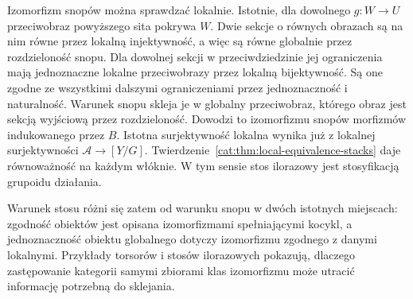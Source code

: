 \begin{przyklad}
Izomorfizm snopów można sprawdzać lokalnie. Istotnie, dla dowolnego $g:W\to U$ przeciwobraz powyższego sita pokrywa $W$. Dwie sekcje o równych obrazach są na nim równe przez lokalną injektywność, a więc są równe globalnie przez rozdzieloność snopu. Dla dowolnej sekcji w przeciwdziedzinie jej ograniczenia mają jednoznaczne lokalne przeciwobrazy przez lokalną bijektywność. Są one zgodne ze wszystkimi dalszymi ograniczeniami przez jednoznaczność i naturalność. Warunek snopu skleja je w globalny przeciwobraz, którego obraz jest sekcją wyjściową przez rozdzieloność. Dowodzi to izomorfizmu snopów morfizmów indukowanego przez $B$. Istotna surjektywność lokalna wynika już z lokalnej surjektywności $\mathcal A\to[Y/G]$. Twierdzenie~\ref{cat:thm:local-equivalence-stacks} daje równoważność na każdym włóknie. W tym sensie stos ilorazowy jest stosyfikacją grupoidu działania.
\end{przyklad}

Warunek stosu różni się zatem od warunku snopu w dwóch istotnych miejscach: zgodność obiektów jest opisana izomorfizmami spełniającymi kocykl, a jednoznaczność obiektu globalnego dotyczy izomorfizmu zgodnego z danymi lokalnymi. Przykłady torsorów i stosów ilorazowych pokazują, dlaczego zastępowanie kategorii samymi zbiorami klas izomorfizmu może utracić informację potrzebną do sklejania.

